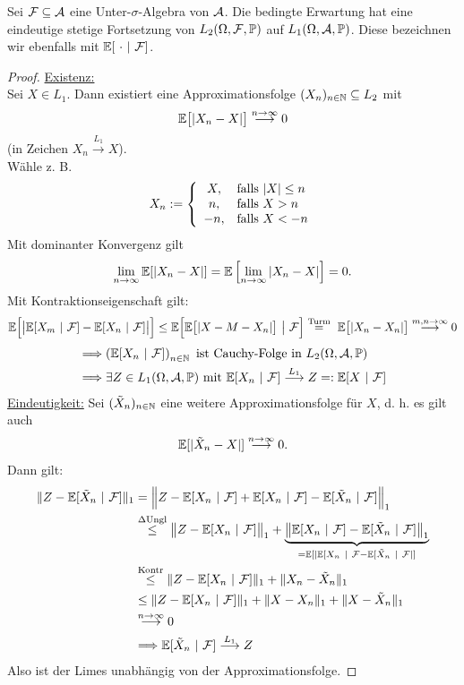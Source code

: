 \setcounter{satz}{5} %
\begin{proposition}\label{Prop1.6} %
Sei $\mathcal{F}\subseteq\mathcal{A}$ eine Unter-$\sigma$-Algebra von $\mathcal{A}$.\enter
Die bedingte Erwartung hat eine eindeutige stetige Fortsetzung von $L_2(\Omega,\mathcal{F},\mathbb{P})$ auf $L_1(\Omega,\mathcal{A},\mathbb{P})$. Diese bezeichnen wir ebenfalls mit $\mathbb{E}[~\cdot~|~\mathcal{F}]$.
\end{proposition}
\begin{proof}
\underline{Existenz:}\\
Sei $X\in L_1$. Dann existiert eine Approximationsfolge $(X_n)_{n\in\mathbb{N}}\subseteq L_2$ mit 
\[\mathbb{E}\big[|X_n-X|\big]\stackrel{n\to\infty}{\longrightarrow}0\] 
(in Zeichen $X_n\stackrel{L_1}{\longrightarrow} X$).\\
Wähle z. B.
\begin{align*}
X_n:=\left\lbrace\begin{array}{cl}
X, & \text{falls } |X|\leq n\\
n, & \text{falls } X>n\\
-n, & \text{falls } X<-n
\end{array}\right.
\end{align*}
Mit dominanter Konvergenz gilt 
\begin{align*}
\lim\limits_{n\to\infty}\mathbb{E}[|X_n-X|]=\mathbb{E}\left[\lim\limits_{n\to\infty}|X_n-X|\right]=0.
\end{align*}
Mit Kontraktionseigenschaft gilt:
\[\mathbb{E}\Big[\big|\mathbb{E}[X_m~|~\mathcal{F}]-\mathbb{E}[X_n~|~\mathcal{F}]\big|\Big]
	\leq\mathbb{E}\Big[\mathbb{E}\big[|X-M-X_n|\big]~\big|~\mathcal{F}\Big]
\stackrel{\text{Turm}}{=}~
\mathbb{E}\big[|X_n-X_n|\big]
\stackrel{m,n\to\infty}{\longrightarrow}
0\]
\begin{align*}
&\Longrightarrow\left(\mathbb{E}[X_n~|~\mathcal{F}]\right)_{n\in\mathbb{N}}\text{ ist Cauchy-Folge in }L_2(\Omega,\mathcal{A},\mathbb{P})\\
&\Longrightarrow\exists Z\in L_1(\Omega,\mathcal{A},\mathbb{P})\text{ mit }\mathbb{E}[X_n~|~\mathcal{F}]\stackrel{L_1}{\longrightarrow} Z=:\mathbb{E}[X~|~\mathcal{F}]
\end{align*}
\underline{Eindeutigkeit:} Sei $(\tilde{X}_n)_{n\in\mathbb{N}}$ eine weitere Approximationsfolge für $X$, d. h. es gilt auch
\begin{align*}
\mathbb{E}[|\tilde{X}_n-X|]
\stackrel{n\to\infty}{\longrightarrow}
0.
\end{align*}
Dann gilt:
\begin{align*}
\Vert Z-\mathbb{E}[\tilde{X}_n~|~\mathcal{F}]\Vert_1
&=\Big
\Vert Z-\mathbb{E}[X_n~|~\mathcal{F}]+\mathbb{E}[X_n~|~\mathcal{F}]-\mathbb{E}[\tilde{X}_n~|~\mathcal{F}]\Big\Vert_1\\
&\stackrel{\Delta\text{Ungl}}{\leq}
\big\Vert Z-\mathbb{E}[X_n~|~\mathcal{F}]\big\Vert_1+\underbrace{\big\Vert\mathbb{E}[X_n~|~\mathcal{F}]-\mathbb{E}[\tilde{X}_n~|~\mathcal{F}]\big\Vert_1}_{=\mathbb{E}[|\mathbb{E}[X_n~|~\mathcal{F}-\mathbb{E}[\tilde{X}_n~|~\mathcal{F}|]}\\
&\stackrel{\text{Kontr}}{\leq}
\Vert Z-\mathbb{E}[X_n~|~\mathcal{F}]\Vert_1+\Vert X_n-\tilde{X}_n\Vert_1\\
&\leq\Vert Z-\mathbb{E}[X_n~|~\mathcal{F}]\Vert_1+\Vert X-X_n\Vert_1+\Vert X-\tilde{X}_n\Vert_1\\
&\stackrel{n\to\infty}{\longrightarrow}
0\\
&\Longrightarrow\mathbb{E}[\tilde{X}_n~|~\mathcal{F}]\stackrel{L_1}{\longrightarrow} Z
\end{align*}
Also ist der Limes unabhängig von der Approximationsfolge.
\end{proof}

